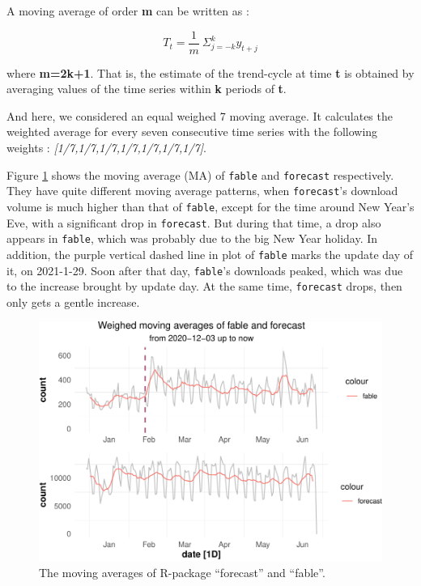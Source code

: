 \documentclass[
]{book}
\begin{document}
A moving average of order \textbf{m} can be written as :

\[T_t = \frac1m\ \Sigma_{j = -k}^{k}y_{t+j} \]

where \textbf{m=2k+1}. That is, the estimate of the trend-cycle at time \textbf{t} is obtained by averaging values of the time series within \textbf{k} periods of \textbf{t}.

And here, we considered an equal weighed 7 moving average. It calculates the weighted average for every seven consecutive time series with the following weights : \emph{{[}1/7,1/7,1/7,1/7,1/7,1/7,1/7{]}}.

Figure \ref{fig:ff-ma} shows the moving average (MA) of \texttt{fable} and \texttt{forecast} respectively. They have quite different moving average patterns, when \texttt{forecast}'s download volume is much higher than that of \texttt{fable}, except for the time around New Year's Eve, with a significant drop in \texttt{forecast}. But during that time, a drop also appears in \texttt{fable}, which was probably due to the big New Year holiday. In addition, the purple vertical dashed line in plot of \texttt{fable} marks the update day of it, on 2021-1-29. Soon after that day, \texttt{fable}'s downloads peaked, which was due to the increase brought by update day. At the same time, \texttt{forecast} drops, then only gets a gentle increase.



\begin{figure}

{\centering \includegraphics{figures/ff-ma-1} 

}

\caption{The moving averages of R-package ``forecast'' and ``fable''.}\label{fig:ff-ma}
\end{figure}
\end{document}
